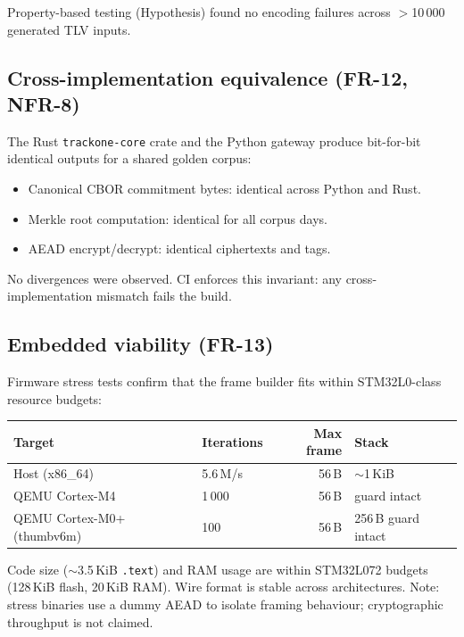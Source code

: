 Property-based testing (Hypothesis) found no encoding failures across
$>$10\,000 generated TLV inputs.

\subsection{Cross-implementation equivalence (FR-12, NFR-8)}

The Rust \texttt{trackone-core} crate and the Python gateway produce
bit-for-bit identical outputs for a shared golden corpus:

\begin{itemize}[nosep]
  \item Canonical \ac{CBOR} commitment bytes: identical across Python and Rust.
  \item Merkle root computation: identical for all corpus days.
  \item \ac{AEAD} encrypt/decrypt: identical ciphertexts and tags.
\end{itemize}

No divergences were observed. \ac{CI} enforces this invariant: any
cross-implementation mismatch fails the build.

\subsection{Embedded viability (FR-13)}

Firmware stress tests confirm that the frame builder fits within
STM32L0-class resource budgets:

\begin{center}
    \small
    \begin{tabular}{llrl}
        \toprule
        \textbf{Target} & \textbf{Iterations} & \textbf{Max frame} & \textbf{Stack} \\
        \midrule
        Host (x86\_64)                & 5.6\,M/s   & 56\,B & $\sim$1\,KiB \\
        QEMU Cortex-M4               & 1\,000      & 56\,B & guard intact \\
        QEMU Cortex-M0+ (thumbv6m)   & 100         & 56\,B & 256\,B guard intact \\
        \bottomrule
    \end{tabular}
\end{center}

Code size ($\sim$3.5\,KiB \texttt{.text}) and RAM usage are within
STM32L072 budgets (128\,KiB flash, 20\,KiB RAM). Wire format is
stable across architectures.
Note: stress binaries use a dummy \ac{AEAD}
to isolate framing behaviour; cryptographic throughput is not claimed.

